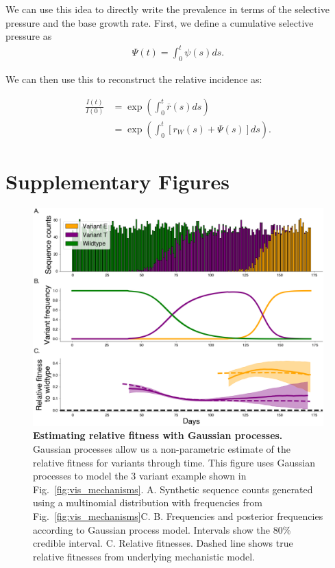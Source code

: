 \documentclass[11pt,oneside,letterpaper]{article}
\newcommand{\wt}{W}
\begin{document}
We can use this idea to directly write the prevalence in terms of the selective pressure and the base growth rate.
First, we define a cumulative selective pressure as
\begin{align*}
\Psi(t) = \int_{0}^{t} \psi(s) ds.
\end{align*}

We can then use this to reconstruct the relative incidence as:

\begin{align*}
    \frac{I(t)}{I(0)} &= \exp\left(\int_{0}^{t} \overline{r}(s) ds\right)\\
         &= \exp \left(\int_{0}^{t} [r_{\wt}(s) + \Psi(s)]ds \right).
\end{align*}


\section*{Supplementary Figures}

\begin{figure}[h]
    \centering
    \includegraphics[width=1.0\linewidth]{./supplementary_figures/gp_example.png}
    \caption{
    \textbf{Estimating relative fitness with Gaussian processes.}
      Gaussian processes allow us a non-parametric estimate of the relative fitness for variants through time.
      This figure uses Gaussian processes to model the 3 variant example shown in Fig.~\ref{fig:vis_mechanisms}.
      A. Synthetic sequence counts generated using a multinomial distribution with frequencies from Fig.~\ref{fig:vis_mechanisms}C.
      B. Frequencies and posterior frequencies according to Gaussian process model. Intervals show the 80\% credible interval.
      C. Relative fitnesses. Dashed line shows true relative fitnesses from underlying mechanistic model.
    }
    \label{fig:gp_example}
\end{figure}
\end{document}
